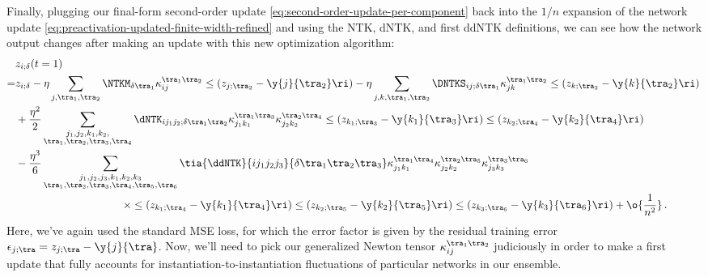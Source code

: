 Finally, plugging our final-form second-order update  \eqref{eq:second-order-update-per-component} back into the $1/n$ expansion of the network update 
\eqref{eq:preactivation-updated-finite-width-refined}
and using the NTK, dNTK, and first ddNTK definitions, we can see how the network output changes after making an update with this new optimization algorithm: 
\begin{align}\label{eq:preactivation-updated-finite-width-decomposition-kappa-genearlized}
&z_{i;\delta}(t=1)\, \\
=&z_{i;\delta}-\eta\sum_{j,\tra_1, \tra_2}\NTKM_{\delta\tra_1}\kappa^{\tra_1\tra_2}_{ij}\le(z_{j;\tra_2}-\y{j}{\tra_2}\ri) -\eta\sum_{j,k,\tra_1, \tra_2}\DNTKS_{ij;\delta\tra_1}\kappa^{\tra_1\tra_2}_{jk}\le(z_{k;\tra_2}-\y{k}{\tra_2}\ri) \, \notag\\
&+\frac{\eta^2}{2}\sum_{ \substack{j_1,j_2,k_1,k_2, \\ \tra_1,\tra_2,\tra_3,\tra_4} }\dNTK_{i j_1j_2;\delta\tra_1\tra_2} \kappa^{\tra_1\tra_3}_{j_1k_1}\kappa^{\tra_2\tra_4}_{j_2k_2} \le(z_{k_1;\tra_3}-\y{k_1}{\tra_3}\ri)\le(z_{k_2;\tra_4}-\y{k_2}{\tra_4}\ri) \, \notag \\
&-\frac{\eta^3}{6}\sum_{\substack{j_1,j_2,j_3, k_1, k_2, k_3 \\ \tra_1,\tra_2,\tra_3,\tra_4,\tra_5, \tra_6} }\tia{\ddNTK}{i j_1j_2j_3}{\delta\tra_1\tra_2\tra_3}  
\kappa^{\tra_1\tra_4}_{j_1k_1}\kappa^{\tra_2\tra_5}_{j_2k_2}\kappa^{\tra_3\tra_6}_{j_3k_3}  \, \notag \\
&\qquad\qquad\qquad\qquad\qquad\times \le(z_{k_1;\tra_4}-\y{k_1}{\tra_4}\ri)\le(z_{k_2;\tra_5}-\y{k_2}{\tra_5}\ri)\le(z_{k_3;\tra_6}-\y{k_3}{\tra_6}\ri)
+\o{\frac{1}{n^2}}\, .\notag
\end{align}
Here, we've again used the standard MSE loss, for which the error factor is given by the residual training error $\epsilon_{j;\tra}=z_{j;\tra}-\y{j}{\tra}$. Now, we'll need to pick our generalized Newton tensor $\kappa^{\tra_1\tra_2}_{ij}$ judiciously in order to make a first update that fully accounts for instantiation-to-instantiation fluctuations of particular networks in our ensemble. %











